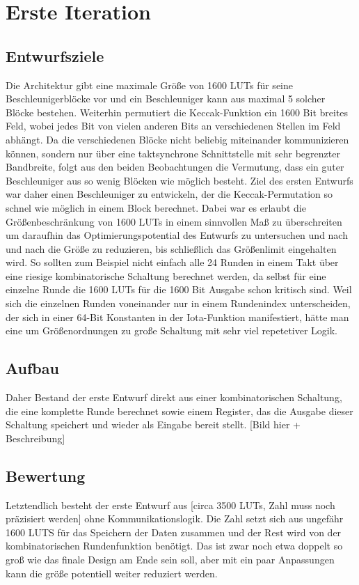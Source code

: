 \section{Erste Iteration}

\subsection{Entwurfsziele}
Die Architektur gibt eine maximale Größe von 1600 LUTs für seine Beschleunigerblöcke vor und ein Beschleuniger kann aus maximal 5 solcher Blöcke bestehen.
Weiterhin permutiert die Keccak-Funktion ein 1600 Bit breites Feld, wobei jedes Bit von vielen anderen Bits an verschiedenen Stellen im Feld abhängt.
Da die verschiedenen Blöcke nicht beliebig miteinander kommunizieren können, sondern nur über eine taktsynchrone Schnittstelle mit sehr begrenzter Bandbreite,
folgt aus den beiden Beobachtungen die Vermutung, dass ein guter Beschleuniger aus so wenig Blöcken wie möglich besteht.
Ziel des ersten Entwurfs war daher einen Beschleuniger zu entwickeln, der die Keccak-Permutation so schnel wie möglich in einem Block berechnet.
Dabei war es erlaubt die Größenbeschränkung von 1600 LUTs in einem sinnvollen Maß zu überschreiten um daraufhin das Optimierungspotential des Entwurfs zu untersuchen
und nach und nach die Größe zu reduzieren, bis schließlich das Größenlimit eingehalten wird.
So sollten zum Beispiel nicht einfach alle 24 Runden in einem Takt über eine riesige kombinatorische Schaltung berechnet werden,
da selbst für eine einzelne Runde die 1600 LUTs für die 1600 Bit Ausgabe schon kritisch sind.
Weil sich die einzelnen Runden voneinander nur in einem Rundenindex unterscheiden, der sich in einer 64-Bit Konstanten in der Iota-Funktion manifestiert,
hätte man eine um Größenordnungen zu große Schaltung mit sehr viel repetetiver Logik.

\subsection{Aufbau}
Daher Bestand der erste Entwurf direkt aus einer kombinatorischen Schaltung, die eine komplette Runde berechnet sowie einem Register,
das die Ausgabe dieser Schaltung speichert und wieder als Eingabe bereit stellt.
[Bild hier + Beschreibung]

\subsection{Bewertung}
Letztendlich besteht der erste Entwurf aus [circa 3500 LUTs, Zahl muss noch präzisiert werden] ohne Kommunikationslogik.
Die Zahl setzt sich aus ungefähr 1600 LUTS für das Speichern der Daten zusammen und der Rest wird von der kombinatorischen Rundenfunktion benötigt.
Das ist zwar noch etwa doppelt so groß wie das finale Design am Ende sein soll, aber mit ein paar Anpassungen kann die größe potentiell weiter reduziert werden.

